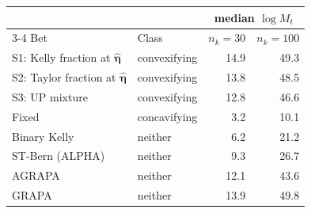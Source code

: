 \begin{tabular}{llrr}
\toprule
 & & \multicolumn{2}{c}{median $\log M_t$}\\
\cmidrule(lr){3-4}
Bet & Class & $n_k=30$ & $n_k=100$\\
\midrule
S1: Kelly fraction at $\hat{\boldsymbol\eta}$ & convexifying & 14.9 & 49.3\\
S2: Taylor fraction at $\hat{\boldsymbol\eta}$ & convexifying & 13.8 & 48.5\\
S3: UP mixture & convexifying & 12.8 & 46.6\\
\addlinespace
Fixed & concavifying & 3.2 & 10.1\\
Binary Kelly & neither & 6.2 & 21.2\\
ST-Bern (ALPHA) & neither & 9.3 & 26.7\\
AGRAPA & neither & 12.1 & 43.6\\
GRAPA & neither & 13.9 & 49.8\\
\bottomrule
\end{tabular}
